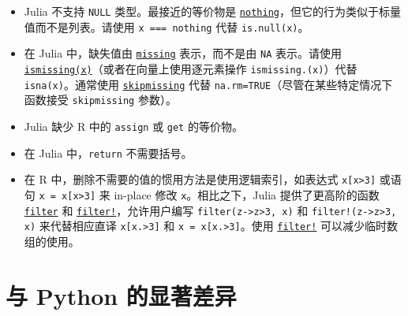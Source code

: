\begin{itemize}
\item Julia 不支持 \texttt{NULL} 类型。最接近的等价物是 \hyperlink{9331422207248206047}{\texttt{nothing}}，但它的行为类似于标量值而不是列表。请使用 \texttt{x === nothing} 代替 \texttt{is.null(x)}。


\item 在 Julia 中，缺失值由 \hyperlink{14596725676261444434}{\texttt{missing}} 表示，而不是由 \texttt{NA} 表示。请使用 \hyperlink{3452327148507948899}{\texttt{ismissing(x)}}（或者在向量上使用逐元素操作 \texttt{ismissing.(x)}）代替 \texttt{isna(x)}。通常使用 \hyperlink{2012470681884771400}{\texttt{skipmissing}} 代替 \texttt{na.rm=TRUE}（尽管在某些特定情况下函数接受 \texttt{skipmissing} 参数）。


\item Julia 缺少 R 中的 \texttt{assign} 或 \texttt{get} 的等价物。


\item 在 Julia 中，\texttt{return} 不需要括号。


\item 在 R 中，删除不需要的值的惯用方法是使用逻辑索引，如表达式 \texttt{x[x>3]} 或语句 \texttt{x = x[x>3]} 来 in-place 修改 \texttt{x}。相比之下，Julia 提供了更高阶的函数 \hyperlink{11445961893478569145}{\texttt{filter}} 和 \hyperlink{3384092630307389071}{\texttt{filter!}}，允许用户编写 \texttt{filter(z->z>3, x)} 和 \texttt{filter!(z->z>3, x)} 来代替相应直译 \texttt{x[x.>3]} 和 \texttt{x = x[x.>3]}。使用 \hyperlink{3384092630307389071}{\texttt{filter!}} 可以减少临时数组的使用。

\end{itemize}


\hypertarget{13471211736636773349}{}


\section{与 Python 的显著差异}



